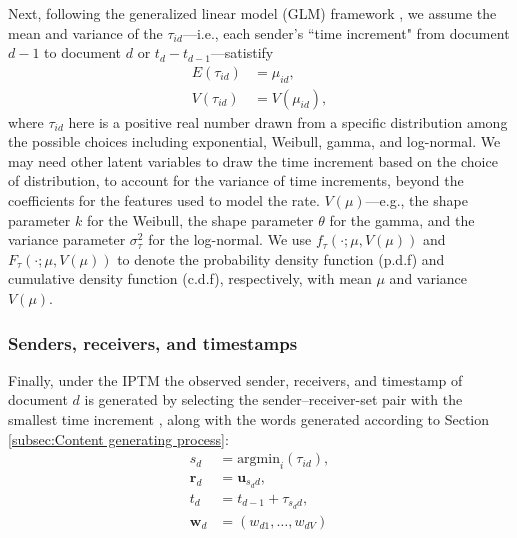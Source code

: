 \documentclass[ba]{imsart}
\numberwithin{equation}{section}
\theoremstyle{plain}
\begin{document}
	Next, following the generalized linear model (GLM) framework \citep{nelder1972generalized}, we assume the mean and variance of the $\tau_{id}$---i.e., each sender's ``time increment" from document $d-1$ to document $d$ or $t_d-t_{d-1}$---satistify
	\begin{equation}
		\begin{aligned}
			E(\tau_{id}) &= \mu_{id},\\
			V(\tau_{id}) &= V(\mu_{id}),
		\end{aligned}
	\end{equation}
	where $\tau_{id}$ here is a positive real number drawn from a specific distribution among the possible choices including exponential, Weibull, gamma, and log-normal. We may need other latent variables to draw the time increment based on the choice of distribution, to account for the variance of time increments, beyond the coefficients for the features used to model the rate. $V(\mu)$---e.g., the shape parameter $k$ for the Weibull, the shape parameter $\theta$ for the gamma, and the variance parameter $\sigma_\tau^2$ for the log-normal. We use $f_\tau(\cdot; \mu, V(\mu))$ and $F_\tau(\cdot; \mu, V(\mu))$ to denote the probability density function (p.d.f) and cumulative density function (c.d.f), respectively, with mean $\mu$ and variance $V(\mu)$.~
	\subsubsection{Senders, receivers, and timestamps}\label{subsubsec:Observed}
	Finally, under the IPTM the observed sender, receivers, and timestamp of document $d$ is generated by selecting the sender--receiver-set pair with the smallest time increment \citep{snijders1996stochastic}, along with the words generated according to Section \ref{subsec:Content generating process}:
	\begin{equation}
		\begin{aligned}
			s_d &= \mbox{argmin}_{i}(\tau_{id}),\\
			\boldsymbol{r}_d &= \boldsymbol{u}_{s_d d},\\
			t_d &=t_{d-1} + \tau_{s_d d},\\
					\boldsymbol{w}_d &=(w_{d1},\ldots,w_{dV})
		\end{aligned}
	\end{equation}
~
\end{document}
